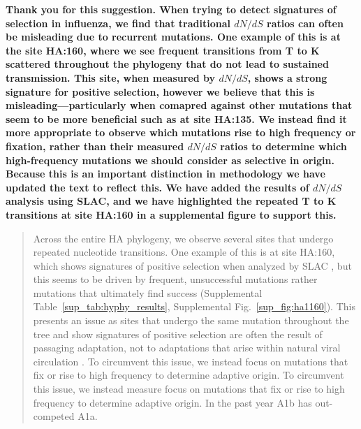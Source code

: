 \documentclass[11pt,oneside,letterpaper]{article}
\begin{document}
\textbf{Thank you for this suggestion. When trying to detect signatures of selection in influenza, we find that traditional $dN/dS$ ratios can often be misleading due to recurrent mutations. One example of this is at the site HA:160, where we see frequent transitions from T to K scattered throughout the phylogeny that do not lead to sustained transmission. This site, when measured by $dN/dS$, shows a strong signature for positive selection, however we believe that this is misleading---particularly when comapred against other mutations that seem to be more beneficial such as at site HA:135. We instead find it more appropriate to observe which mutations rise to high frequency or fixation, rather than their measured $dN/dS$ ratios to determine which high-frequency mutations we should consider as selective in origin. Because this is an important distinction in methodology we have updated the text to reflect this. We have added the results of $dN/dS$ analysis using SLAC, and we have highlighted the repeated T to K transitions at site HA:160 in a supplemental figure to support this.}

\begin{quotation}
  Across the entire HA phylogeny, we observe several sites that undergo repeated nucleotide transitions.
  One example of this is at site HA:160, which shows signatures of positive selection when analyzed by SLAC \citep{pond_2005}, but this seems to be driven by frequent, unsuccessful mutations rather mutations that ultimately find success (Supplemental Table~\ref{sup_tab:hyphy_results}, Supplemental Fig.~\ref{sup_fig:ha1160}).
  This presents an issue as sites that undergo the same mutation throughout the tree and show signatures of positive selection are often the result of passaging adaptation, not to adaptations that arise within natural viral circulation \citep{10.1371/journal.ppat.1004940, McWhite2016SequenceAV}.
  To circumvent this issue, we instead focus on mutations that fix or rise to high frequency to determine adaptive origin.
  To circumvent this issue, we instead measure focus on mutations that fix or rise to high frequency to determine adaptive origin.
  In the past year A1b has out-competed A1a.
\end{quotation}
\end{document}
